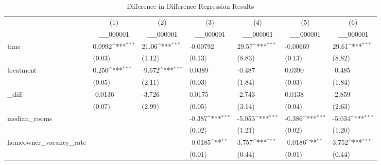 \begingroup
    {
    \small
    \def\sym#1{\ifmmode^{#1}\else\(^{#1}\)\fi}
    \centering
    \begin{longtable}{|l|ll|ll|ll|}
    \caption{Difference-in-Difference Regression Results}
    \label{dd_res}
    \hline\hline
        &\multicolumn{1}{c}{(1)}&\multicolumn{1}{c}{(2)}&\multicolumn{1}{c}{(3)}&\multicolumn{1}{c}{(4)}&\multicolumn{1}{c}{(5)}&\multicolumn{1}{c}{(6)}\\
        &\multicolumn{1}{c}{\_\_000001}&\multicolumn{1}{c}{\_\_000001}&\multicolumn{1}{c}{\_\_000001}&\multicolumn{1}{c}{\_\_000001}&\multicolumn{1}{c}{\_\_000001}&\multicolumn{1}{c}{\_\_000001}\\
            \hline
            time        &      0.0992\sym{***}&       21.06\sym{***}&    -0.00792         &       29.57\sym{***}&    -0.00669         &       29.61\sym{***}\\
                        &      (0.03)         &      (1.12)         &      (0.13)         &      (8.83)         &      (0.13)         &      (8.82)         \\
            [1em]
            treatment   &       0.250\sym{***}&      -9.672\sym{***}&      0.0389         &      -0.487         &      0.0390         &      -0.485         \\
                        &      (0.05)         &      (2.11)         &      (0.03)         &      (1.84)         &      (0.03)         &      (1.84)         \\
            [1em]
            \_diff       &     -0.0136         &      -3.726         &      0.0175         &      -2.743         &      0.0138         &      -2.859         \\
                        &      (0.07)         &      (2.99)         &      (0.05)         &      (3.14)         &      (0.04)         &      (2.63)         \\
            [1em]
            median\_rooms&                     &                     &      -0.387\sym{***}&      -5.053\sym{***}&      -0.386\sym{***}&      -5.034\sym{***}\\
                        &                     &                     &      (0.02)         &      (1.21)         &      (0.02)         &      (1.20)         \\
            [1em]
            homeowner\_vacancy\_rate&                     &                     &     -0.0185\sym{**} &       3.757\sym{***}&     -0.0186\sym{**} &       3.752\sym{***}\\
                        &                     &                     &      (0.01)         &      (0.44)         &      (0.01)         &      (0.44)         \\

\end{longtable}}
